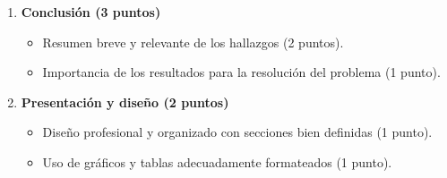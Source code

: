 \documentclass[a4,11pt]{aleph-notas}
\begin{document}
\begin{enumerate}[leftmargin=*, label=\textbf{\arabic*.}]
    \item \textbf{Conclusión (3 puntos)}
    \begin{itemize}[leftmargin=*]
        \item Resumen breve y relevante de los hallazgos (2 puntos).
        \item Importancia de los resultados para la resolución del problema (1 punto).
    \end{itemize}

    \item \textbf{Presentación y diseño (2 puntos)}
    \begin{itemize}[leftmargin=*]
        \item Diseño profesional y organizado con secciones bien definidas (1 punto).
        \item Uso de gráficos y tablas adecuadamente formateados (1 punto).
    \end{itemize}
\end{enumerate}
\end{document}
